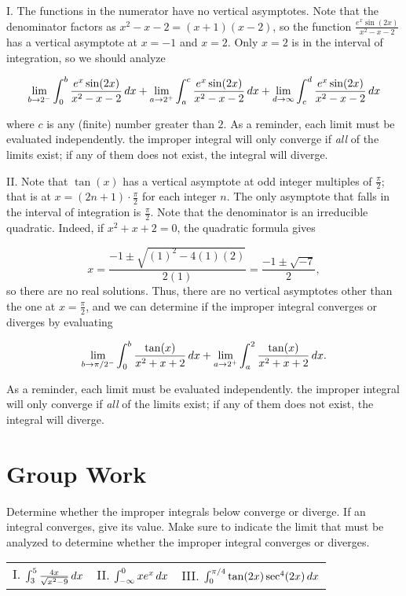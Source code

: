 \documentclass[handout]{ximera}
\begin{document}
\begin{freeResponse}
I.  The functions in the numerator have no vertical asymptotes.  Note that the denominator factors as $x^2-x-2 = (x+1)(x-2)$, so the function $\frac{e^x\sin(2x)}{x^2-x-2}$ has a vertical asymptote at $x=-1$ and $x=2$.  Only $x=2$ is in the interval of integration, so we should analyze

\[
\lim_{b \to 2^-} \int_0^b \frac{e^x\sin(2x)}{x^2-x-2} \mathop{}\!d x +\lim_{a \to 2^+} \int_a^c \frac{e^x\sin(2x)}{x^2-x-2} \mathop{}\!d x + \lim_{d \to \infty} \int_c^d \frac{e^x\sin(2x)}{x^2-x-2} \mathop{}\!d x
\]

where $c$ is any (finite) number greater than $2$.  As a reminder, each limit must be evaluated independently.  the improper integral will only converge if \emph{all} of the limits exist; if any of them does not exist, the integral will diverge.

II.  Note that $\tan(x)$ has a vertical asymptote at odd integer multiples of $\frac{\pi}{2}$; that is at $x = (2n+1) \cdot \frac{\pi}{2}$ for each integer $n$.  The only asymptote that falls in the interval of integration is $\frac{\pi}{2}$.  Note that the denominator is an irreducible quadratic.  Indeed, if $x^2+x+2=0$, the quadratic formula gives 

\[
x = \frac{-1 \pm \sqrt{(1)^2-4(1)(2)}}{2(1)} =  \frac{-1 \pm \sqrt{-7}}{2},
\]
so there are no real solutions.  Thus, there are no vertical asymptotes other than the one at $x=\frac{\pi}{2}$, and we can determine if the improper integral converges or diverges by evaluating 

\[
\lim_{b \to \pi/2^-} \int_0^b \frac{\tan(x)}{x^2+x+2} \mathop{}\!d x +\lim_{a \to 2^+} \int_a^2 \frac{\tan(x)}{x^2+x+2} \mathop{}\!d x. 
\]

As a reminder, each limit must be evaluated independently.  the improper integral will only converge if \emph{all} of the limits exist; if any of them does not exist, the integral will diverge.


\end{freeResponse}

\section{Group Work}

\begin{problem}
Determine whether the improper integrals below converge or diverge.  If an integral converges, give its value.  Make sure to indicate the limit that must be analyzed to determine whether the improper integral converges or diverges.
\begin{center}
\begin{tabular}{lll}
I.  $\int_3^5 \frac{4x}{\sqrt{x^2-9}} \mathop{}\!d x$  \hspace{.5in} & II. $\int_{-\infty}^0 x e^x \mathop{}\!d x$  \hspace{.5in}  & III. $\int_0^{\pi/4} \tan(2x)\sec^4(2x) \mathop{}\!d x$
\end{tabular}
\end{center}
\end{problem}
\end{document}
